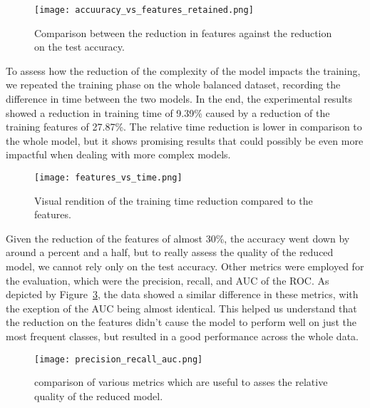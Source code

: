 \begin{figure}[H]
	\centering
	\texttt{[image: accuuracy\_vs\_features\_retained.png]}
	\caption{Comparison between the reduction in features against the reduction on the test accuracy.}\label{fig:accuracy_vs_features_retained}
\end{figure}

\noindent
To assess how the reduction of the complexity of the model impacts the training,
we repeated the training phase on the whole balanced dataset, recording the difference in time between the two models.
In the end, the experimental results showed a reduction in training time of 9.39\% caused by a reduction of the training features of 27.87\%.
The relative time reduction is lower in comparison to the whole model, but it shows promising results that
could possibly be even more impactful when dealing with more complex models.

\begin{figure}[H]
	\centering
	\texttt{[image: features\_vs\_time.png]}
	\caption{Visual rendition of the training time reduction compared to the features.}\label{fig:features_vs_time}
\end{figure}

\noindent
Given the reduction of the features of almost 30\%, the accuracy went down by around a percent and a half,
but to really assess the quality of the reduced model, we cannot rely only on the test accuracy.
Other metrics were employed for the evaluation, which were the precision, recall, and AUC of the ROC.
As depicted by Figure~\ref{fig:precision_recall_auc},
the data showed a similar difference in these metrics, with the exeption of the AUC being almost identical.
This helped us understand that the reduction on the features didn't cause the model to perform well on just the most frequent classes,
but resulted in a good performance across the whole data.

\begin{figure}[H]
	\centering
	\texttt{[image: precision\_recall\_auc.png]}
	\caption{comparison of various metrics which are useful to asses the relative quality of the reduced model.}\label{fig:precision_recall_auc}
\end{figure}
\noindent



